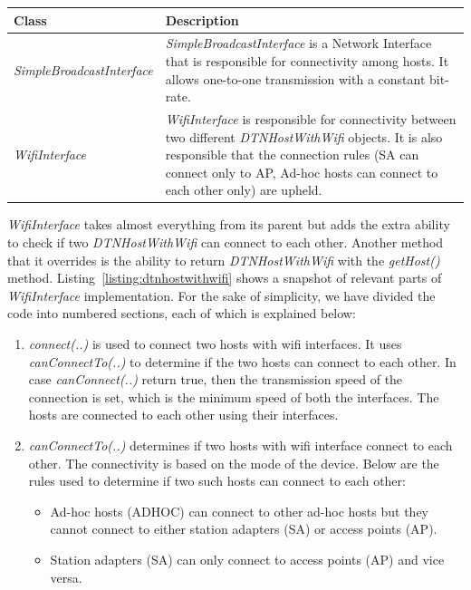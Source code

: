 \begin{center}
	    \begin{tabular}{ | l | p{10cm} |}
    		\hline
    		\textbf{Class} & \textbf{Description} \\ \hline
    		\textit{SimpleBroadcastInterface} & \textit{SimpleBroadcastInterface} is a Network Interface that is responsible for connectivity among hosts. It allows one-to-one transmission with a constant bit-rate.\\ \hline
    		\textit{WifiInterface} & \textit{WifiInterface} is responsible for connectivity between two different \textit{DTNHostWithWifi} objects. It is also responsible that the connection rules (SA can connect only to AP, Ad-hoc hosts can connect to each other only) are upheld. \\ \hline
    	\end{tabular}
	\end{center}
\vspace{3mm}
\textit{WifiInterface} takes almost everything from its parent but adds the extra ability to check if two \textit{DTNHostWithWifi} can connect to each other. Another method that it overrides is the ability to return \textit{DTNHostWithWifi} with the \textit{getHost()} method.\newline
\newline
Listing~\ref{listing:dtnhostwithwifi} shows a snapshot of relevant parts of \textit{WifiInterface} implementation. For the sake of simplicity, we have divided the code into numbered sections, each of which is explained below:
\begin{enumerate}
	\item \textit{connect(..)} is used to connect two hosts with wifi interfaces. It uses \textit{canConnectTo(..)} to determine if the two hosts can connect to each other. In case \textit{canConnect(..)} return true, then the transmission speed of the connection is set, which is the minimum speed of both the interfaces. The hosts are connected to each other using their interfaces.
	\item \textit{canConnectTo(..)} determines if two hosts with wifi interface connect to each other. The connectivity is based on the mode of the device. Below are the rules used to determine if two such hosts can connect to each other:
		\begin{itemize}
			\item Ad-hoc hosts (ADHOC) can connect to other ad-hoc hosts but they cannot connect to either station adapters (SA) or access points (AP).
			\item Station adapters (SA) can only connect to access points (AP) and vice versa.
		\end{itemize}
\end{enumerate}


